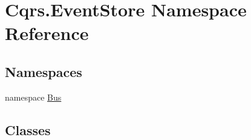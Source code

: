 \hypertarget{namespaceCqrs_1_1EventStore}{}\section{Cqrs.\+Event\+Store Namespace Reference}
\label{namespaceCqrs_1_1EventStore}
\subsection*{Namespaces}
\begin{DoxyCompactItemize}
\item 
namespace \hyperlink{namespaceCqrs_1_1EventStore_1_1Bus}{Bus}
\end{DoxyCompactItemize}
\subsection*{Classes}

